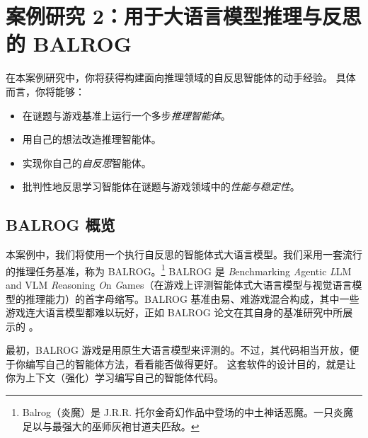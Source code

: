 \chapter[案例研究 2：推理与反思]{案例研究 2：用于大语言模型推理与反思的 BALROG}\label{chap:balrog}

\begin{learningbox}
在本案例研究中，你将获得构建面向推理领域的自反思智能体的动手经验。
具体而言，你将能够：
\begin{itemize}[leftmargin=*, nosep]
    \item 在谜题与游戏基准上运行一个多步{\em 推理智能体}。
    \item 用自己的想法改造推理智能体。
    \item 实现你自己的{\em 自反思}智能体。
    \item 批判性地反思学习智能体在谜题与游戏领域中的{\em 性能与稳定性}。
\end{itemize}
\end{learningbox}

\section{BALROG 概览}
本案例中，我们将使用一个执行自反思的智能体式大语言模型。我们采用一套流行的推理任务基准，称为 BALROG。\footnote{Balrog（炎魔）是 J.R.R. 托尔金奇幻作品中登场的中土神话恶魔。一只炎魔足以与最强大的巫师灰袍甘道夫匹敌。} BALROG 是 {\em B}enchmarking {\em A}gentic {\em L}LM and VLM {\em R}easoning {\em O}n {\em G}ames（在游戏上评测智能体式大语言模型与视觉语言模型的推理能力）的首字母缩写。BALROG 基准由易、难游戏混合构成，其中一些游戏连大语言模型都难以玩好，正如 BALROG 论文在其自身的基准研究中所展示的 \citep{paglieri2024balrog}。

最初，BALROG 游戏是用原生大语言模型来评测的。不过，其代码相当开放，便于你编写自己的智能体方法，看看能否做得更好。
这套软件的设计目的，就是让你为上下文（强化）学习编写自己的智能体代码。




